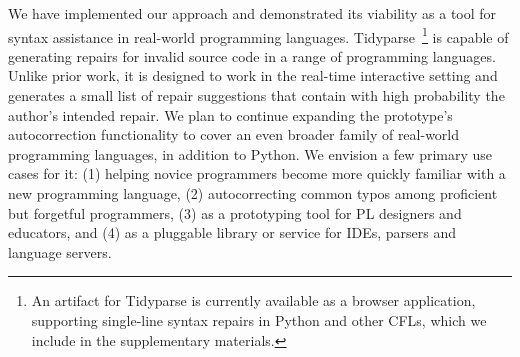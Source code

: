 \documentclass[popl.tex]{subfiles}
\begin{document}
We have implemented our approach and demonstrated its viability as a tool for syntax assistance in real-world programming languages. Tidyparse~\footnote{An artifact for Tidyparse is currently available as a browser application, supporting single-line syntax repairs in Python and other CFLs, which we include in the supplementary materials.} is capable of generating repairs for invalid source code in a range of programming languages. Unlike prior work, it is designed to work in the real-time interactive setting and generates a small list of repair suggestions that contain with high probability the author's intended repair. We plan to continue expanding the prototype's autocorrection functionality to cover an even broader family of real-world programming languages, in addition to Python. We envision a few primary use cases for it: (1) helping novice programmers become more quickly familiar with a new programming language, (2) autocorrecting common typos among proficient but forgetful programmers, (3) as a prototyping tool for PL designers and educators, and (4) as a pluggable library or service for IDEs, parsers and language servers.
\ifSubfilesClassLoaded{\par\clearpage}{}
\end{document}
